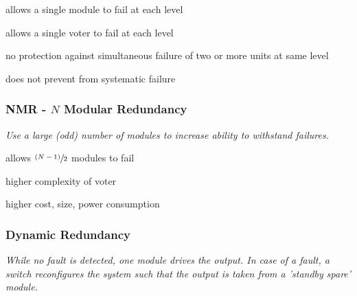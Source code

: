 \documentclass[
  10pt,
  a4paper,
  twocolumn]{article}
\begin{document}
\resizebox{\columnwidth}{!}{
}

{\small\begin{description}[parsep=0mm,labelsep=2pt,labelwidth=10pt]
  \item[\color{OliveGreen}\faPlus] allows a single module to fail at each level
  \item[\color{OliveGreen}\faPlus] allows a single voter to fail at each level
  \item[\color{BrickRed}\faMinus] no protection against simultaneous failure of two or more units at same level
  \item[\color{BrickRed}\faMinus] does not prevent from systematic failure
\end{description}}

\subsubsection{\texorpdfstring{NMR - \(N\) Modular
Redundancy}{NMR - N Modular Redundancy}}\label{nmr---n-modular-redundancy}

{\small\textit{Use a large (odd) number of modules to increase ability to withstand failures.}}

\begin{center}

\end{center}

{\small\begin{description}[parsep=0mm,labelsep=2pt,labelwidth=10pt]
  \item[\color{OliveGreen}\faPlus] allows  $\sfrac{(N-1)}{2}$ modules to fail
  \item[\color{BrickRed}\faMinus] higher complexity of voter
  \item[\color{BrickRed}\faMinus] higher cost, size, power consumption
\end{description}}

\subsubsection{Dynamic Redundancy}\label{dynamic-redundancy}

{\small\textit{While no fault is detected, one module drives the output. In case of a fault, a switch reconfigures the system such that the output is taken from a ’standby spare’ module.}}

\begin{center}

\end{center}
\end{document}
